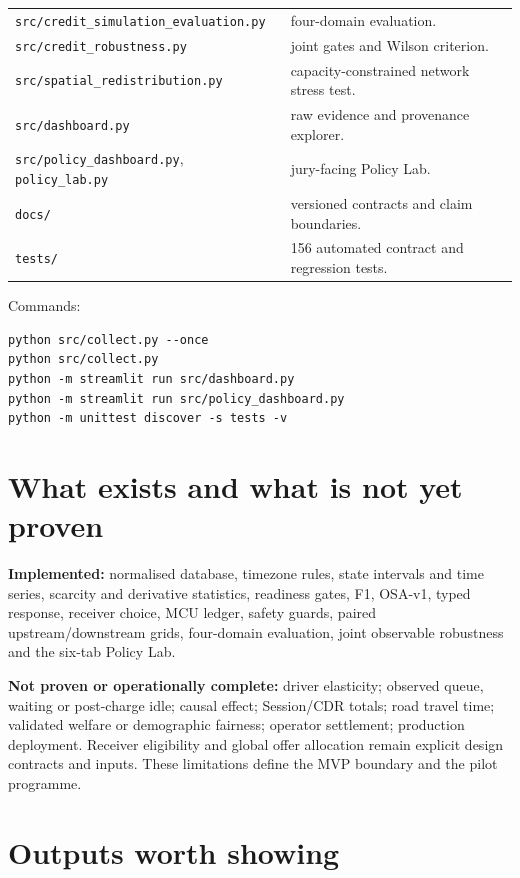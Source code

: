 \documentclass[11pt,a4paper]{article}
\newcommand{\code}[1]{\texttt{#1}}
\begin{document}
\begin{longtable}{p{5.4cm}p{10.6cm}}
\texttt{src/credit\_simulation\_}\allowbreak\texttt{evaluation.py} & four-domain evaluation. \\
\code{src/credit\_robustness.py} & joint gates and Wilson criterion. \\
\code{src/spatial\_redistribution.py} & capacity-constrained network stress test. \\
\code{src/dashboard.py} & raw evidence and provenance explorer. \\
\code{src/policy\_dashboard.py}, \code{policy\_lab.py} & jury-facing Policy Lab. \\
\code{docs/} & versioned contracts and claim boundaries. \\
\code{tests/} & 156 automated contract and regression tests. \\
\bottomrule
\end{longtable}

Commands:
\begin{verbatim}
python src/collect.py --once
python src/collect.py
python -m streamlit run src/dashboard.py
python -m streamlit run src/policy_dashboard.py
python -m unittest discover -s tests -v
\end{verbatim}

\section{What exists and what is not yet proven}

\textbf{Implemented:} normalised database, timezone rules, state intervals and time series, scarcity and derivative statistics, readiness gates, F1, OSA-v1, typed response, receiver choice, MCU ledger, safety guards, paired upstream/downstream grids, four-domain evaluation, joint observable robustness and the six-tab Policy Lab.

\textbf{Not proven or operationally complete:} driver elasticity; observed queue, waiting or post-charge idle; causal effect; Session/CDR totals; road travel time; validated welfare or demographic fairness; operator settlement; production deployment. Receiver eligibility and global offer allocation remain explicit design contracts and inputs. These limitations define the MVP boundary and the pilot programme.

\section{Outputs worth showing}
\end{document}
